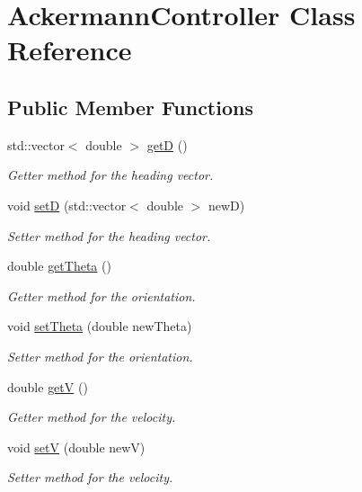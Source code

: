 \hypertarget{classAckermannController}{}\section{Ackermann\+Controller Class Reference}
\label{classAckermannController}
\subsection*{Public Member Functions}
\begin{DoxyCompactItemize}
\item 
std\+::vector$<$ double $>$ \hyperlink{classAckermannController_a1df741d625ae47d40ec4bff179061488}{getD} ()
\begin{DoxyCompactList}\small\item\em Getter method for the heading vector. \end{DoxyCompactList}\item 
void \hyperlink{classAckermannController_a8e30ccd76d72b7cb861fe4b05427bc8e}{setD} (std\+::vector$<$ double $>$ newD)
\begin{DoxyCompactList}\small\item\em Setter method for the heading vector. \end{DoxyCompactList}\item 
double \hyperlink{classAckermannController_a3a6fd7f667287ab11d5f15b2d299fcd7}{get\+Theta} ()
\begin{DoxyCompactList}\small\item\em Getter method for the orientation. \end{DoxyCompactList}\item 
void \hyperlink{classAckermannController_a16295a9391eefa1c6bbf265258b9a7b9}{set\+Theta} (double new\+Theta)
\begin{DoxyCompactList}\small\item\em Setter method for the orientation. \end{DoxyCompactList}\item 
double \hyperlink{classAckermannController_a9c373294e90f14555ebb44a9375b3531}{getV} ()
\begin{DoxyCompactList}\small\item\em Getter method for the velocity. \end{DoxyCompactList}\item 
void \hyperlink{classAckermannController_ae25138b1ea820a8122c5eaab2c4dde27}{setV} (double newV)
\begin{DoxyCompactList}\small\item\em Setter method for the velocity. \end{DoxyCompactList}\item 

\end{DoxyCompactItemize}
